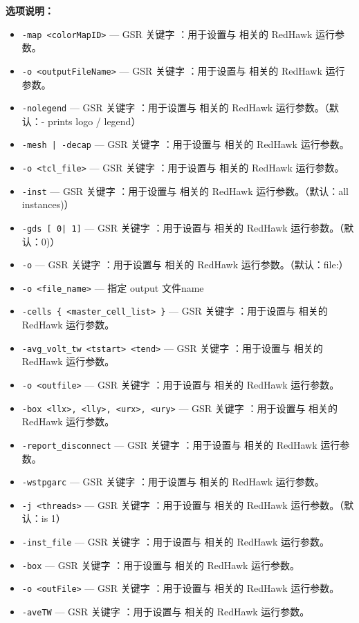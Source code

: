 \textbf{选项说明：}
\begin{itemize}
\item \texttt{-map <colorMapID>} — GSR 关键字 ：用于设置与  相关的 RedHawk 运行参数。
\item \texttt{-o <outputFileName>} — GSR 关键字 ：用于设置与  相关的 RedHawk 运行参数。
\item \texttt{-nolegend} — GSR 关键字 ：用于设置与  相关的 RedHawk 运行参数。（默认：- prints logo / legend）
\item \texttt{-mesh | -decap} — GSR 关键字 ：用于设置与  相关的 RedHawk 运行参数。
\item \texttt{-o <tcl\_file>} — GSR 关键字 ：用于设置与  相关的 RedHawk 运行参数。
\item \texttt{-inst} — GSR 关键字 ：用于设置与  相关的 RedHawk 运行参数。（默认：all instances)）
\item \texttt{-gds [ 0| 1]} — GSR 关键字 ：用于设置与  相关的 RedHawk 运行参数。（默认：0)）
\item \texttt{-o} — GSR 关键字 ：用于设置与  相关的 RedHawk 运行参数。（默认：file:）
\item \texttt{-o <file\_name>} — 指定 output 文件name
\item \texttt{-cells \{ <master\_cell\_list> \}} — GSR 关键字 ：用于设置与  相关的 RedHawk 运行参数。
\item \texttt{-avg\_volt\_tw <tstart> <tend>} — GSR 关键字 ：用于设置与  相关的 RedHawk 运行参数。
\item \texttt{-o <outfile>} — GSR 关键字 ：用于设置与  相关的 RedHawk 运行参数。
\item \texttt{-box <llx>, <lly>, <urx>, <ury>} — GSR 关键字 ：用于设置与  相关的 RedHawk 运行参数。
\item \texttt{-report\_disconnect} — GSR 关键字 ：用于设置与  相关的 RedHawk 运行参数。
\item \texttt{-wstpgarc} — GSR 关键字 ：用于设置与  相关的 RedHawk 运行参数。
\item \texttt{-j <threads>} — GSR 关键字 ：用于设置与  相关的 RedHawk 运行参数。（默认：is 1）
\item \texttt{-inst\_file} — GSR 关键字 ：用于设置与  相关的 RedHawk 运行参数。
\item \texttt{-box} — GSR 关键字 ：用于设置与  相关的 RedHawk 运行参数。
\item \texttt{-o <outFile>} — GSR 关键字 ：用于设置与  相关的 RedHawk 运行参数。
\item \texttt{-aveTW} — GSR 关键字 ：用于设置与  相关的 RedHawk 运行参数。

\end{itemize}
